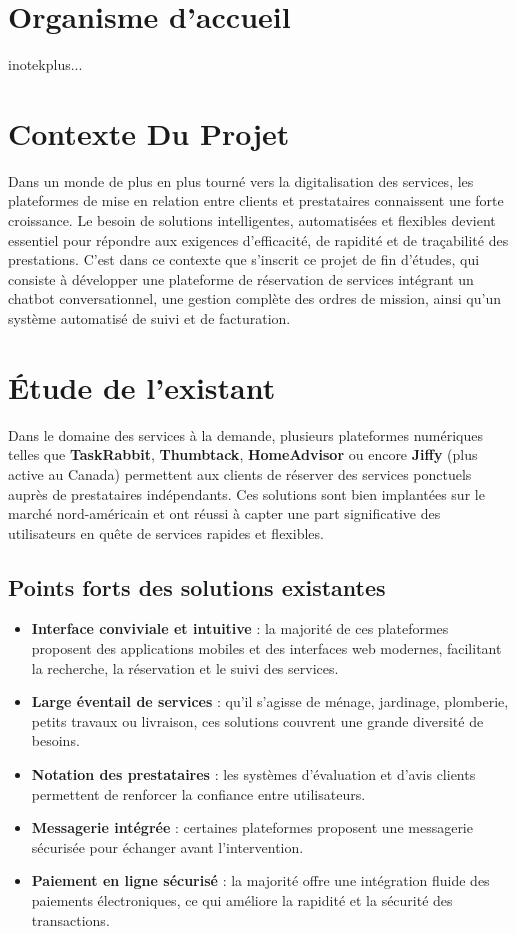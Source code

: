 \section{Organisme d’accueil}

inotekplus...


\section{Contexte Du Projet} 
Dans un monde de plus en plus tourné vers la digitalisation des services, les plateformes de mise en relation entre clients et prestataires connaissent une forte croissance. Le besoin de solutions intelligentes, automatisées et flexibles devient essentiel pour répondre aux exigences d’efficacité, de rapidité et de traçabilité des prestations. C’est dans ce contexte que s’inscrit ce projet de fin d’études, qui consiste à développer une plateforme de réservation de services intégrant un chatbot conversationnel, une gestion complète des ordres de mission, ainsi qu’un système automatisé de suivi et de facturation.



\section{Étude de l’existant}

Dans le domaine des services à la demande, plusieurs plateformes numériques telles que \textbf{TaskRabbit}, \textbf{Thumbtack}, \textbf{HomeAdvisor} ou encore \textbf{Jiffy} (plus active au Canada) permettent aux clients de réserver des services ponctuels auprès de prestataires indépendants. Ces solutions sont bien implantées sur le marché nord-américain et ont réussi à capter une part significative des utilisateurs en quête de services rapides et flexibles.

\subsection*{Points forts des solutions existantes}
\begin{itemize}
  \item \textbf{Interface conviviale et intuitive} : la majorité de ces plateformes proposent des applications mobiles et des interfaces web modernes, facilitant la recherche, la réservation et le suivi des services.
  \item \textbf{Large éventail de services} : qu’il s’agisse de ménage, jardinage, plomberie, petits travaux ou livraison, ces solutions couvrent une grande diversité de besoins.
  \item \textbf{Notation des prestataires} : les systèmes d’évaluation et d’avis clients permettent de renforcer la confiance entre utilisateurs.
  \item \textbf{Messagerie intégrée} : certaines plateformes proposent une messagerie sécurisée pour échanger avant l’intervention.
  \item \textbf{Paiement en ligne sécurisé} : la majorité offre une intégration fluide des paiements électroniques, ce qui améliore la rapidité et la sécurité des transactions.
\end{itemize}

